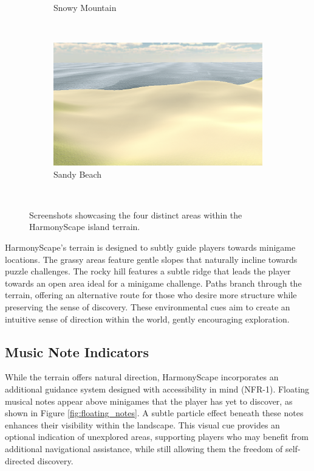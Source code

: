\documentclass{l4proj}
\begin{document}
\begin{figure}[h]
\begin{subfigure}[b]{0.22\textwidth}
    \caption{Snowy Mountain}
    \label{fig:terrain_snowy}
  \end{subfigure}
  ~ 
  \begin{subfigure}[b]{0.22\textwidth}
   \includegraphics[width=\textwidth]{dissertation/images/sandy_terrain.png}
   \caption{Sandy Beach} 
   \label{fig:terrain_beach}
  \end{subfigure}
  ~  
  \caption{Screenshots showcasing the four distinct areas within the HarmonyScape island terrain.} 
  \label{fig:terrain}
\end{figure}

HarmonyScape's terrain is designed to subtly guide players towards minigame locations. The grassy areas feature gentle slopes that naturally incline towards puzzle challenges. The rocky hill features a subtle ridge that leads the player towards an open area ideal for a minigame challenge. Paths branch through the terrain, offering an alternative route for those who desire more structure while preserving the sense of discovery. These environmental cues aim to create an intuitive sense of direction within the world, gently encouraging exploration.

\subsection{Music Note Indicators}
While the terrain offers natural direction, HarmonyScape incorporates an additional guidance system designed with accessibility in mind (NFR-1). Floating musical notes appear above minigames that the player has yet to discover, as shown in Figure \ref{fig:floating_notes}. A subtle particle effect beneath these notes enhances their visibility within the landscape. This visual cue provides an optional indication of unexplored areas, supporting players who may benefit from additional navigational assistance, while still allowing them the freedom of self-directed discovery.
\end{document}
